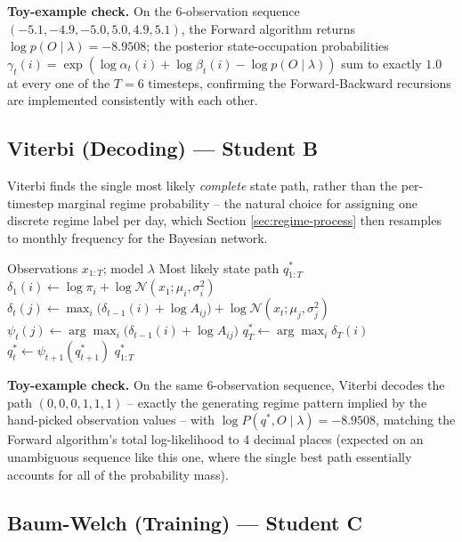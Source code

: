 \textbf{Toy-example check.} On the 6-observation sequence $(-5.1, -4.9,
-5.0, 5.0, 4.9, 5.1)$, the Forward algorithm returns $\log
p(O\mid\lambda) = -8.9508$; the posterior state-occupation probabilities
$\gamma_t(i) = \exp(\log\alpha_t(i) + \log\beta_t(i) - \log
p(O\mid\lambda))$ sum to exactly $1.0$ at every one of the $T=6$
timesteps, confirming the Forward-Backward recursions are implemented
consistently with each other.

\subsection{Viterbi (Decoding) --- Student B}

Viterbi finds the single most likely \emph{complete} state path, rather
than the per-timestep marginal regime probability -- the natural choice
for assigning one discrete regime label per day, which Section
\ref{sec:regime-process} then resamples to monthly frequency for the Bayesian
network.

\begin{algorithm}[H]
\caption{Viterbi algorithm (log-space)}
\begin{algorithmic}[1]
\Require Observations $x_{1:T}$; model $\lambda$
\Ensure Most likely state path $q_{1:T}^\ast$
  \State $\delta_1(i) \gets \log\pi_i + \log\mathcal{N}(x_1;\mu_i,\sigma_i^2)$
\EndFor
{}
    \State $\delta_t(j) \gets \max_i\bigl(\delta_{t-1}(i) + \log A_{ij}\bigr) + \log\mathcal{N}(x_t;\mu_j,\sigma_j^2)$
    \State $\psi_t(j) \gets \arg\max_i\bigl(\delta_{t-1}(i) + \log A_{ij}\bigr)$ 
  \EndFor
\EndFor
\State $q_T^\ast \gets \arg\max_i \delta_T(i)$
  \State $q_t^\ast \gets \psi_{t+1}(q_{t+1}^\ast)$ 
\EndFor
\State \Return $q_{1:T}^\ast$
\end{algorithmic}
\end{algorithm}

\textbf{Toy-example check.} On the same 6-observation sequence, Viterbi
decodes the path $(0,0,0,1,1,1)$ -- exactly the generating regime
pattern implied by the hand-picked observation values -- with
$\log P(q^\ast, O \mid \lambda) = -8.9508$, matching the Forward
algorithm's total log-likelihood to 4 decimal places (expected on an
unambiguous sequence like this one, where the single best path
essentially accounts for all of the probability mass).

\subsection{Baum-Welch (Training) --- Student C}


